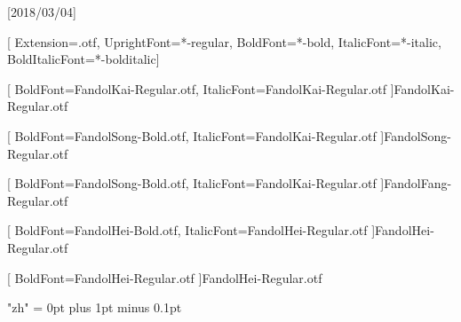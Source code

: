
[2018/03/04]

\setsansfont{texgyreheros}[
	Extension=.otf,
	UprightFont=*-regular,
	BoldFont=*-bold,
	ItalicFont=*-italic,
	BoldItalicFont=*-bolditalic]	%





[
	BoldFont=FandolKai-Regular.otf, ItalicFont=FandolKai-Regular.otf
]{FandolKai-Regular.otf}

[
	BoldFont=FandolSong-Bold.otf,
	ItalicFont=FandolKai-Regular.otf
]{FandolSong-Regular.otf}

[
	BoldFont=FandolSong-Bold.otf,
	ItalicFont=FandolKai-Regular.otf
]{FandolFang-Regular.otf}

[
	BoldFont=FandolHei-Bold.otf,
	ItalicFont=FandolHei-Regular.otf
]{FandolHei-Regular.otf}


[
	BoldFont=FandolHei-Regular.otf
]{FandolHei-Regular.otf}	%

\XeTeXlinebreaklocale "zh"
\XeTeXlinebreakskip = 0pt plus 1pt minus 0.1pt

\newcommand\kaishu{\CJKfamily{kai}} %
\newcommand\songti{\CJKfamily{song}} %
\newcommand\heiti{\CJKfamily{hei}}	%
\newcommand\thmheiti{\CJKfamily{hei2}}	%
\newcommand\fangsong{\CJKfamily{fangsong}} %
\renewcommand{\em}{\bfseries\CJKfamily{emfont}} %
